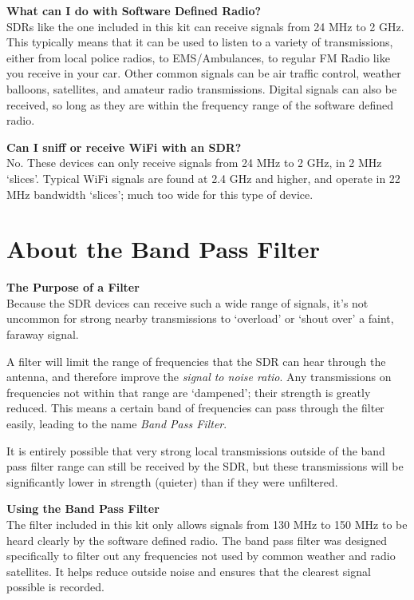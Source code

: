 \documentclass[10pt,foldmark,notumble]{leaflet}
\begin{document}
\textbf{What can I do with Software Defined Radio?}\\
SDRs like the one included in this kit can receive signals from 24 MHz to 2 GHz.
This typically means that it can be used to listen to a variety of transmissions,
either from local police radios, to EMS/Ambulances, to regular FM Radio like you
receive in your car.
Other common signals can be air traffic control, weather balloons, satellites,
and amateur radio transmissions.
Digital signals can also be received, so long as they are within the frequency
range of the software defined radio.

\textbf{Can I sniff or receive WiFi with an SDR?}\\
No. These devices can only receive signals from 24 MHz to 2 GHz, in 2 MHz
`slices'.
Typical WiFi signals are found at 2.4 GHz and higher, and operate
in 22 MHz bandwidth `slices'; much too wide for this type of device.

\section{About the Band Pass Filter\color{red}\hrulefill\color{black}}
\textbf{The Purpose of a Filter}\\
Because the SDR devices can receive such a wide range of signals, it's not
uncommon for strong nearby transmissions to `overload' or `shout over' a faint,
faraway signal.

A filter will limit the range of frequencies that the SDR can hear through the
antenna, and therefore improve the \emph{signal to noise ratio}.
Any transmissions on frequencies not within that range are `dampened'; their
strength is greatly reduced.
This means a certain band of frequencies can pass through the filter easily,
leading to the name \emph{Band Pass Filter}.

It is entirely possible that very strong local transmissions outside of the band
pass filter range can still be received by the SDR, but these transmissions will
be significantly lower in strength (quieter) than if they were unfiltered.

\textbf{Using the Band Pass Filter}\\
The filter included in this kit only allows signals from 130 MHz to 150 MHz
to be heard clearly by the software defined radio.
The band pass filter was designed specifically to filter out any frequencies not
used by common weather and radio satellites.
It helps reduce outside noise and ensures that the clearest signal possible is recorded.
\end{document}
